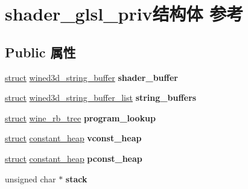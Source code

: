 \hypertarget{structshader__glsl__priv}{}\section{shader\+\_\+glsl\+\_\+priv结构体 参考}
\label{structshader__glsl__priv}
\subsection*{Public 属性}
\begin{DoxyCompactItemize}
\item 
\mbox{\label{structshader__glsl__priv_af2e309d06bac674a9e4de6b4352d0609}} 
\hyperlink{interfacestruct}{struct} \hyperlink{structwined3d__string__buffer}{wined3d\+\_\+string\+\_\+buffer} {\bfseries shader\+\_\+buffer}
\item 
\mbox{\label{structshader__glsl__priv_a514a8aaa878062b21bf34647601db5a2}} 
\hyperlink{interfacestruct}{struct} \hyperlink{structwined3d__string__buffer__list}{wined3d\+\_\+string\+\_\+buffer\+\_\+list} {\bfseries string\+\_\+buffers}
\item 
\mbox{\label{structshader__glsl__priv_ae84b8610a690f95ba6d9b767a4fc80fc}} 
\hyperlink{interfacestruct}{struct} \hyperlink{structwine__rb__tree}{wine\+\_\+rb\+\_\+tree} {\bfseries program\+\_\+lookup}
\item 
\mbox{\label{structshader__glsl__priv_abb26d970d66236067babe896d82d486d}} 
\hyperlink{interfacestruct}{struct} \hyperlink{structconstant__heap}{constant\+\_\+heap} {\bfseries vconst\+\_\+heap}
\item 
\mbox{\label{structshader__glsl__priv_a0c546f58dcb067f2fdfd19e975820734}} 
\hyperlink{interfacestruct}{struct} \hyperlink{structconstant__heap}{constant\+\_\+heap} {\bfseries pconst\+\_\+heap}
\item 
\mbox{\label{structshader__glsl__priv_a0cc2d8b0e4ead4e6525db6027c38c923}} 
unsigned char $\ast$ {\bfseries stack}
\item 
\mbox{\label{structshader__glsl__priv_acf4a3d40fd17551afe4b326ef377322a}} 

\end{DoxyCompactItemize}

